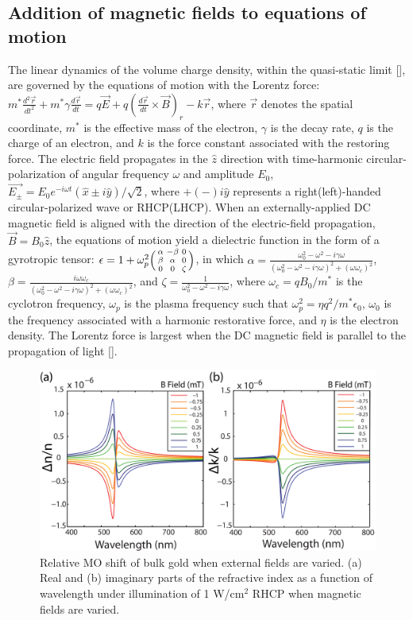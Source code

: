 \subsection{Addition of magnetic fields to equations of motion}

The linear dynamics of the volume charge density, within the quasi-static limit [\cite{MaierBook}], are governed by the equations of motion with the Lorentz force: $m^*\frac{d^2\vec{r}}{dt^2}+m^*\gamma\frac{d\vec{r}}{dt} = q\vec{E} + q(\frac{d\vec{r}}{dt}\times\vec{B})_r-k\vec{r}$, where $\vec{r}$ denotes the spatial coordinate, $m^*$ is the effective mass of the electron, $\gamma$ is the decay rate, $q$ is the charge of an electron, and $k$ is the force constant associated with the restoring force. The electric field propagates in the $\hat{z}$ direction with time-harmonic circular-polarization of angular frequency $\omega$ and amplitude $E_0$, $\vec{E_{\pm}}=E_0 e^{-i\omega t}(\hat{x}\pm i\hat{y})/\sqrt{2}$, where $+(-)i\hat{y}$ represents a right(left)-handed circular-polarized wave or RHCP(LHCP). When an externally-applied DC magnetic field is aligned with the direction of the electric-field propagation, $\vec{B}=B_0\hat{z}$, the equations of motion yield a dielectric function in the form of a gyrotropic tensor: $\epsilon=1+ \omega_p^2\Bigl(\begin{smallmatrix} \alpha& -\beta &0\\ \beta &\alpha&0\\0&0&\zeta\end{smallmatrix}\Bigr)$, in which $\alpha=\frac{\omega_0^2-\omega^2-i\gamma\omega}{(\omega_0^2-\omega^2-i\gamma\omega)^2+(\omega\omega_c)^2}$, $\beta=\frac{i\omega\omega_c}{(\omega_0^2-\omega^2-i\gamma\omega)^2+(\omega\omega_c)^2}$, and $\zeta=\frac{1}{\omega_0^2-\omega^2-i\gamma\omega}$, where $\omega_c=qB_0/m^*$ is the cyclotron frequency, $\omega_p$ is the plasma frequency such that $\omega_p^2 = \eta q^2/m^*\epsilon_0$, $\omega_0$ is the frequency associated with a harmonic restorative force, and $\eta$ is the electron density.  The Lorentz force is largest when the DC magnetic field is parallel to the propagation of light [\cite{Sepulveda}].
\\
\begin{figure}[t]
\centering
\includegraphics[width=\textwidth]{dnk_mT.pdf}
\caption{Relative MO shift of bulk gold when external fields are varied. (a) Real and (b) imaginary parts of the refractive index as a function of wavelength under illumination of 1 W/cm$^2$ RHCP when magnetic fields are varied.}
\label{fig:1}
\end{figure}

